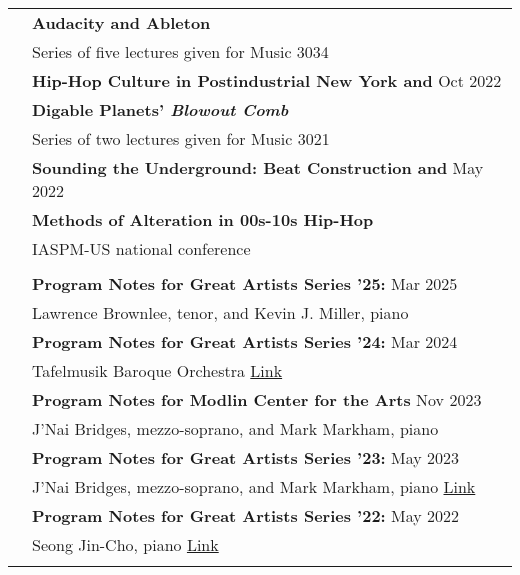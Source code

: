 \documentclass[letterpaper, 11pt]{article}
\begin{document}
\begin{longtable}{p{1.3in}p{4.8in}}
& \textbf{Audacity and Ableton} \\
& Series of five lectures given for Music 3034 \\
& \textbf{Hip-Hop Culture in Postindustrial New York and} \hfill{Oct 2022} \\
& \textbf{Digable Planets' \textit{Blowout Comb}} \\
& Series of two lectures given for Music 3021 \\
& \textbf{Sounding the Underground: Beat Construction and} \hfill{May 2022} \\
& \textbf{Methods of Alteration in 00s-10s Hip-Hop} \\
& IASPM-US national conference \\
& \\


\nohyphens{\color{OliveGreen}{Public Scholarship}} 
& \textbf{Program Notes for Great Artists Series '25:} \hfill{Mar 2025} \\
& Lawrence Brownlee, tenor, and Kevin J. Miller, piano \\
& \textbf{Program Notes for Great Artists Series '24:} \hfill{Mar 2024} \\
& Tafelmusik Baroque Orchestra \hfill \href{https://drive.google.com/file/d/1PLRyvU2Tgae-y5dHgYk3dIMzmQKZlSIq/view?usp=sharing}{Link} \\
& \textbf{Program Notes for Modlin Center for the Arts} \hfill{Nov 2023} \\
& J'Nai Bridges, mezzo-soprano, and Mark Markham, piano \hfill \\
& \textbf{Program Notes for Great Artists Series '23:} \hfill{May 2023} \\
& J'Nai Bridges, mezzo-soprano, and Mark Markham, piano \hfill \href{https://drive.google.com/file/d/1VVsDLn_SQQVU6xove93dTyiRJL8_1enJ/view?usp=sharing}{Link} \\
& \textbf{Program Notes for Great Artists Series '22:} \hfill{May 2022} \\
& Seong Jin-Cho, piano \hfill \href{https://music.wustl.edu/events/great-artists-series-cho?d=2022-05-01}{Link} \\
& \\


\end{longtable}
\end{document}
